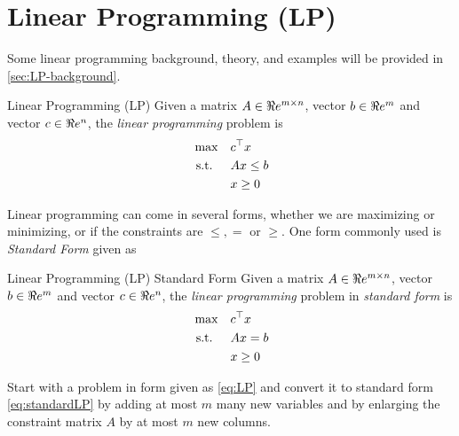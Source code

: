 \section{Linear Programming (LP)}
Some linear programming background, theory, and examples will be provided in \autoref{sec:LP-background}.
\begin{general}{Linear Programming (LP)}{\polynomial}
Given a matrix $A \in \Re e^{m\times n}$, vector $b \in \Re e^m$ and vector $c \in \Re e^n$, the \emph{linear programming} problem is
\begin{equation}
\label{eq:LP}
\begin{split}
\max \quad & c^\top x\\
\mbox{ s.t. }  \quad & Ax \leq b\\
& x \geq 0
\end{split}
\end{equation}
\end{general}

Linear programming can come in several forms, whether we are maximizing or minimizing, or if the constraints are $\leq, =$ or $\geq$.   One form commonly used is \emph{Standard Form} given as 
\begin{general}{Linear Programming (LP) Standard Form}{\polynomial}
Given a matrix $A \in \Re e^{m\times n}$, vector $b \in \Re e^m$ and vector $c \in \Re e^n$, the \emph{linear programming} problem in \emph{standard form} is
\begin{equation}
\label{eq:standardLP}
\begin{split}
\max \quad & c^\top x\\
\mbox{ s.t. }  \quad & Ax = b\\
& x \geq 0
\end{split}
\end{equation}
\end{general}

\begin{exercise}
\label{exercise:LPconversion}
Start with a problem in form given as \eqref{eq:LP} and convert it to standard form \eqref{eq:standardLP} by adding at most $m$ many new variables and by enlarging the constraint matrix $A$ by at most $m$ new columns.
\end{exercise}
